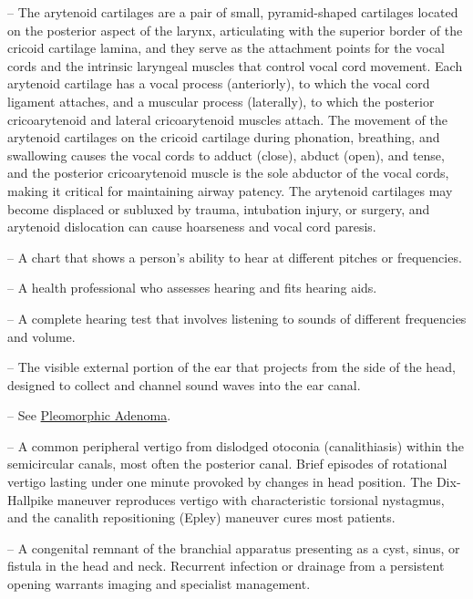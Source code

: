 -- The arytenoid cartilages are a pair of small, pyramid-shaped cartilages located on the posterior aspect of the larynx, articulating with the superior border of the cricoid cartilage lamina, and they serve as the attachment points for the vocal cords and the intrinsic laryngeal muscles that control vocal cord movement. Each arytenoid cartilage has a vocal process (anteriorly), to which the vocal cord ligament attaches, and a muscular process (laterally), to which the posterior cricoarytenoid and lateral cricoarytenoid muscles attach. The movement of the arytenoid cartilages on the cricoid cartilage during phonation, breathing, and swallowing causes the vocal cords to adduct (close), abduct (open), and tense, and the posterior cricoarytenoid muscle is the sole abductor of the vocal cords, making it critical for maintaining airway patency. The arytenoid cartilages may become displaced or subluxed by trauma, intubation injury, or surgery, and arytenoid dislocation can cause hoarseness and vocal cord paresis.

-- A chart that shows a person’s ability to hear at different pitches or frequencies.

-- A health professional who assesses hearing and fits hearing aids.

-- A complete hearing test that involves listening to sounds of different frequencies and volume.

-- The visible external portion of the ear that projects from the side of the head, designed to collect and channel sound waves into the ear canal.

-- See \hyperlink{Pleomorphic Adenoma}{Pleomorphic Adenoma}.

-- A common peripheral vertigo from dislodged otoconia (canalithiasis) within the semicircular canals, most often the posterior canal. Brief episodes of rotational vertigo lasting under one minute provoked by changes in head position. The Dix-Hallpike maneuver reproduces vertigo with characteristic torsional nystagmus, and the canalith repositioning (Epley) maneuver cures most patients.

-- A congenital remnant of the branchial apparatus presenting as a cyst, sinus, or fistula in the head and neck. Recurrent infection or drainage from a persistent opening warrants imaging and specialist management.


